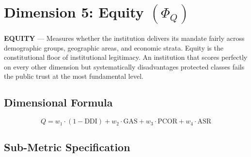 \documentclass[a4paper,11pt]{article}
\begin{document}
	\newpage
	\section{Dimension 5: Equity \texorpdfstring{$(\Phi_Q)$}{}}
	
	\begin{dimensionbox}
		\textbf{\sffamily EQUITY} — Measures whether the institution delivers its mandate fairly across demographic groups, geographic areas, and economic strata. Equity is the constitutional floor of institutional legitimacy. An institution that scores perfectly on every other dimension but systematically disadvantages protected classes fails the public trust at the most fundamental level.
	\end{dimensionbox}
	
	\subsection{Dimensional Formula}
	
	\[
	Q = w_1 \cdot (1 - \text{DDI}) + w_2 \cdot \text{GAS} + w_3 \cdot \text{PCOR} + w_4 \cdot \text{ASR}
	\]
	
	\subsection{Sub-Metric Specification}
	
\end{document}
